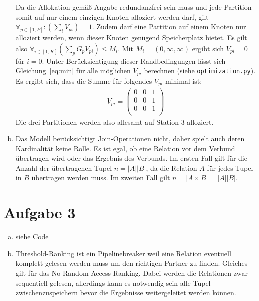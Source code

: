\documentclass[11pt,a4paper]{scrartcl}
\begin{document}
\begin{enumerate}[a)]
  Da die Allokation gemäß Angabe redundanzfrei sein muss und jede Partition
  somit auf nur einem einzigen Knoten alloziert werden darf, gilt $\forall_{p
    \in [1,P]}:\left(\sum_i V_{pi}\right) = 1$.  Zudem darf eine Partition auf
  einem Knoten nur alloziert werden, wenn dieser Knoten genügend Speicherplatz
  bietet.  Es gilt also $\forall_{i \in [1,K]}\left(\sum_{p} G_p V_{pi}\right)
  \le M_i$.  Mit $M_i = \left(0, \infty, \infty\right)$ ergibt sich $V_{pi} =
  0$ für $i = 0$.  Unter Berücksichtigung dieser Randbedingungen lässt sich
  Gleichung~\ref{eq:min} für alle möglichen $V_{pi}$ berechnen (siehe
  \texttt{optimization.py}).  Es ergibt sich, dass die Summe für folgendes
  $V_{pi}$ minimal ist:
  \begin{align*}
    V_{pi} =
    \begin{pmatrix}
      0 & 0 & 1 \\
      0 & 0 & 1 \\
      0 & 0 & 1 \\
    \end{pmatrix}
  \end{align*}
  Die drei Partitionen werden also allesamt auf Station 3 alloziert.
\item Das Modell berücksichtigt Join-Operationen nicht, daher spielt auch deren
  Kardinalität keine Rolle.  Es ist egal, ob eine Relation vor dem Verbund
  übertragen wird oder das Ergebnis des Verbunds. Im ersten Fall gilt für die
  Anzahl der übertragenen Tupel $n = |A||B|$, da die Relation $A$ für jedes Tupel
  in $B$ übertragen werden muss.  Im zweiten Fall gilt $n = |A \times B| = |A||B|$.
\end{enumerate}


\section*{Aufgabe 3}
\begin{enumerate}[a)]
\item siehe Code
\item Threshold-Ranking ist ein Pipelinebreaker weil eine Relation eventuell komplett gelesen werden muss um den richtigen Partner zu finden. Gleiches gilt für das No-Random-Access-Ranking. Dabei werden die Relationen zwar sequentiell gelesen, allerdings kann es notwendig sein alle Tupel zwischenzuspeichern bevor die Ergebnisse weitergeleitet werden können.
\end{enumerate}
\end{document}
